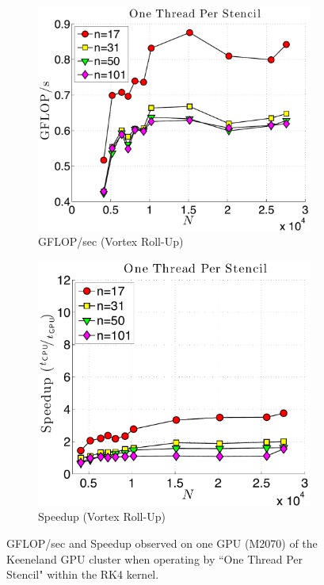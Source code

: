 \begin{figure}
\begin{subfigure}[t]{0.46\textwidth}
\includegraphics[width=\textwidth]{../figures/keeneland_results/alltoallv_vortex/gflops_gpu_1proc_oneThreadPerStencil.pdf}
\caption{GFLOP/sec (Vortex Roll-Up)}
\label{fig:gflops_gpu_1proc_oneThread_keeneland_vortex}
\end{subfigure}
\quad
\begin{subfigure}[t]{0.425\textwidth}
\includegraphics[width=\textwidth]{../figures/keeneland_results/alltoallv_vortex/speedup_1proc_oneThreadPerStencil.pdf}
\caption{Speedup (Vortex Roll-Up)}
\label{fig:speedup_1proc_oneThread_keeneland}
\end{subfigure} 
\caption{GFLOP/sec and Speedup observed on one GPU (M2070) of the Keeneland GPU cluster when operating by ``One Thread Per Stencil" within the RK4 kernel.}
\end{figure} 

